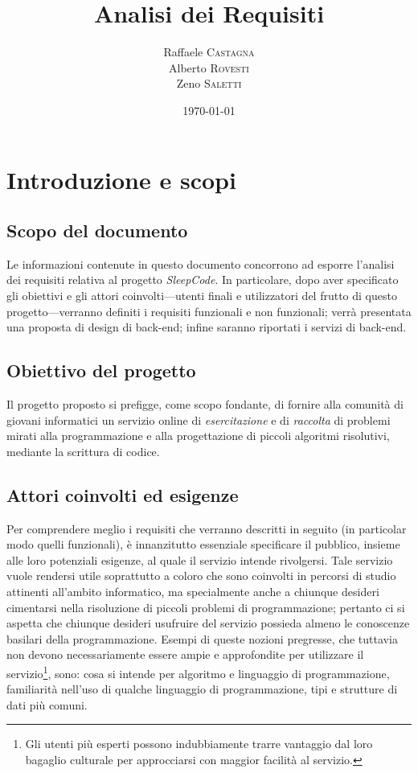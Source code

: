 \documentclass[11pt, a4paper]{article}
\title{Analisi dei Requisiti}
\author{Raffaele \textsc{Castagna}\\
Alberto \textsc{Rovesti}\\
Zeno \textsc{Saletti}}
\date{\today}
\theoremstyle{definition}
\begin{document}


\tableofcontents


\newpage
\section{Introduzione e scopi}
\subsection{Scopo del documento}
Le informazioni contenute in questo documento concorrono ad esporre l'analisi
dei requisiti relativa al progetto \textit{SleepCode}. In particolare, dopo
aver specificato gli obiettivi e gli attori coinvolti—utenti finali e
utilizzatori del frutto di questo progetto—verranno definiti i requisiti
funzionali e non funzionali; verrà presentata una proposta di design di
back-end; infine saranno riportati i servizi di back-end.


\subsection{Obiettivo del progetto}
Il progetto proposto si prefigge, come scopo fondante, di fornire alla comunità
di giovani informatici un servizio online di \textit{esercitazione} e di
\textit{raccolta} di problemi mirati alla programmazione e alla progettazione
di piccoli algoritmi risolutivi, mediante la scrittura di codice.

\subsection{Attori coinvolti ed esigenze}
Per comprendere meglio i requisiti che verranno descritti in seguito (in
particolar modo quelli funzionali), è innanzitutto essenziale specificare
il pubblico, insieme alle loro potenziali esigenze, al quale il servizio
intende rivolgersi.
Tale servizio vuole rendersi utile soprattutto a coloro che sono coinvolti
in percorsi di studio attinenti all'ambito informatico, ma specialmente anche
a chiunque desideri cimentarsi nella risoluzione di piccoli problemi di
programmazione; pertanto ci si aspetta che chiunque desideri usufruire del
servizio possieda almeno le conoscenze basilari della programmazione. Esempi
di queste nozioni pregresse, che tuttavia non devono necessariamente essere ampie e approfondite per utilizzare il servizio\footnote{Gli utenti più esperti possono indubbiamente trarre vantaggio dal loro bagaglio culturale per
approcciarsi con maggior facilità al servizio.}, sono: cosa si intende per
algoritmo e linguaggio di programmazione, familiarità nell'uso di qualche
linguaggio di programmazione, tipi e strutture di dati più comuni.
\end{document}
